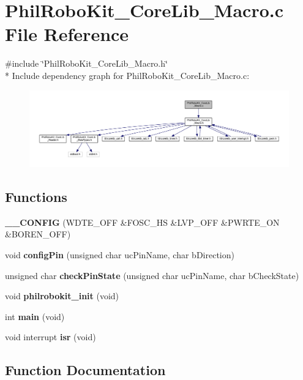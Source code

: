 \section{Phil\-Robo\-Kit\-\_\-\-Core\-Lib\-\_\-\-Macro.\-c File Reference}
\label{_phil_robo_kit___core_lib___macro_8c}
{\ttfamily \#include \char`\"{}Phil\-Robo\-Kit\-\_\-\-Core\-Lib\-\_\-\-Macro.\-h\char`\"{}}\\*
Include dependency graph for Phil\-Robo\-Kit\-\_\-\-Core\-Lib\-\_\-\-Macro.\-c\-:\nopagebreak
\begin{figure}[H]
\begin{center}
\leavevmode
\includegraphics[width=350pt]{_phil_robo_kit___core_lib___macro_8c__incl}
\end{center}
\end{figure}
\subsection*{Functions}
\begin{DoxyCompactItemize}
\item 
{\bf \-\_\-\-\_\-\-C\-O\-N\-F\-I\-G} (W\-D\-T\-E\-\_\-\-O\-F\-F \&F\-O\-S\-C\-\_\-\-H\-S \&L\-V\-P\-\_\-\-O\-F\-F \&P\-W\-R\-T\-E\-\_\-\-O\-N \&B\-O\-R\-E\-N\-\_\-\-O\-F\-F)
\item 
void {\bf config\-Pin} (unsigned char uc\-Pin\-Name, char b\-Direction)
\item 
unsigned char {\bf check\-Pin\-State} (unsigned char uc\-Pin\-Name, char b\-Check\-State)
\item 
void {\bf philrobokit\-\_\-init} (void)
\item 
int {\bf main} (void)
\item 
void interrupt {\bf isr} (void)
\end{DoxyCompactItemize}


\subsection{Function Documentation}
